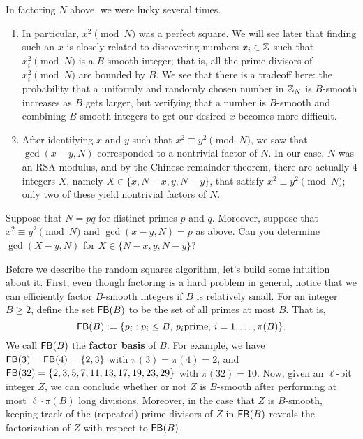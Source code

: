 In factoring $N$ above, we were lucky several times. 
\begin{enumerate}[(1)]
    \item In particular, $x^2 \pmod N$ was a perfect square. We will see later 
    that finding such an $x$ is closely related to discovering numbers 
    $x_i \in \mathbb{Z}$ such that $x_i^2 \pmod N$ is a $B$-smooth integer; that is, 
    all the prime divisors of $x_i^2 \pmod N$ are bounded by $B$. We see that 
    there is a tradeoff here: the probability that a uniformly and randomly 
    chosen number in $\mathbb{Z}_N$ is $B$-smooth increases as $B$ gets larger, 
    but verifying that a number is $B$-smooth and combining $B$-smooth 
    integers to get our desired $x$ becomes more difficult.
    \item After identifying $x$ and $y$ such that $x^2 \equiv y^2 \pmod N$, 
    we saw that $\gcd(x-y, N)$ corresponded to a nontrivial factor of $N$. 
    In our case, $N$ was an RSA modulus, and by the Chinese remainder theorem, 
    there are actually $4$ integers $X$, namely $X \in \{x, N-x, y, N-y\}$, 
    that satisfy $x^2 \equiv y^2 \pmod N$; only two of these yield 
    nontrivial factors of $N$. 
\end{enumerate}

\begin{exercise}
    Suppose that $N = pq$ for distinct primes $p$ and $q$. Moreover, suppose 
    that $x^2 \equiv y^2 \pmod N$ and $\gcd(x-y, N) = p$ as above. Can you 
    determine $\gcd(X-y, N)$ for $X \in \{N-x, y, N-y\}$?
\end{exercise}

Before we describe the random squares algorithm, let's build some 
intuition about it. First, even though factoring is a hard problem in 
general, notice that we can efficiently factor $B$-smooth integers if 
$B$ is relatively small. For an integer $B \geq 2$, define the set 
${\sf FB}(B)$ to be the set of all primes at most $B$. That is, 
\[ {\sf FB}(B) := \{p_i : p_i \leq B,\, p_i \text{prime},\, i = 1, \dots, \pi(B)\}. \] 
We call ${\sf FB}(B)$ the {\bf factor basis} of $B$. For example, we have 
${\sf FB}(3) = {\sf FB}(4) = \{2, 3\}$ with $\pi(3) = \pi(4) = 2$, and 
${\sf FB}(32) = \{2, 3, 5, 7, 11, 13, 17, 19, 23, 29\}$ with $\pi(32) = 10$. 
Now, given an $\ell$-bit integer $Z$, we can conclude whether or not 
$Z$ is $B$-smooth after performing at most $\ell \cdot \pi(B)$ long divisions. 
Moreover, in the case that $Z$ is $B$-smooth, keeping track of the 
(repeated) prime divisors of $Z$ in ${\sf FB}(B)$ reveals the factorization of 
$Z$ with respect to ${\sf FB}(B)$. 

